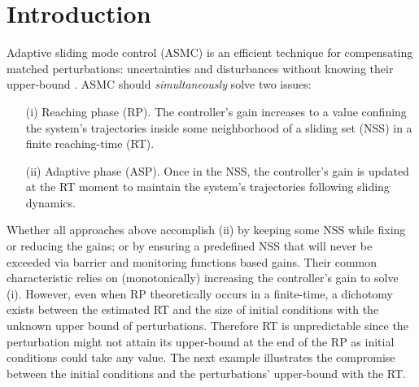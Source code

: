 \documentclass[twocolumn]{autart}    %
\begin{document}
\begin{frontmatter}
\begin{abstract}
\end{abstract}

\end{frontmatter}

\section{Introduction}
Adaptive sliding mode control (ASMC) is an efficient technique for compensating matched perturbations: uncertainties and disturbances without knowing their upper-bound \cite{bartolini2013,hsu2019,incremona2016,negrete2016,obeid18,oliveira2017,plestan2010,xiong2021adaptive}. ASMC should \textit{simultaneously} solve two issues: 
\begin{itemize}
\item [(i)]Reaching phase (RP). The controller's gain increases to a value confining the system's trajectories inside some neighborhood of a sliding set (NSS) in a finite reaching-time (RT).
\item [(ii)] Adaptive phase (ASP). Once in the NSS, the controller's gain is updated at the RT moment to maintain the system's trajectories following sliding dynamics.
\end{itemize}\vspace{-2mm} Whether all approaches above accomplish (ii) by keeping some NSS while fixing \cite{negrete2016,incremona2016} or reducing \cite{shtessel2012,plestan2010} the gains; or by ensuring a predefined NSS that will never be exceeded via barrier \cite{obeid18,obeid20,laghrouche21}  and monitoring \cite{hsu2019,oliveira2017} functions based gains. Their common characteristic relies on (monotonically) increasing the controller's gain to solve (i). However, even when RP theoretically occurs in a finite-time,  a dichotomy exists between the estimated RT and the size of initial conditions with the unknown upper bound of perturbations.  Therefore RT is unpredictable since the perturbation might not attain its upper-bound at the end of the RP as initial conditions could take any value.  The next example illustrates the compromise between the initial conditions and the perturbations' upper-bound with the  RT. \vspace{-4pt}
\end{document}
